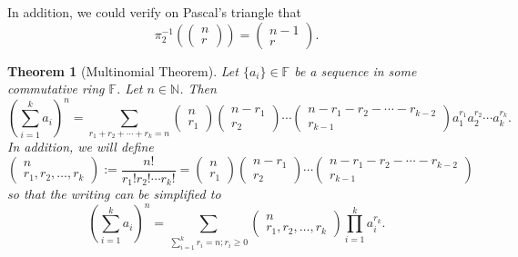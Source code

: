 \documentclass[12pt]{article}
\newtheorem*{theorem}{Theorem}
\begin{document}
    In addition, we could verify on Pascal's triangle that \[\pi_2^{-1}(\begin{pmatrix}
        n\\r
    \end{pmatrix})=\begin{pmatrix}
        n-1\\r
    \end{pmatrix}.\]

    \begin{theorem}[Multinomial Theorem]
        Let $\{a_i\}\in\mathbb{F}$ be a sequence in some commutative ring $\mathbb{F}$. Let $n\in\mathbb{N}$. Then \[(\sum_{i=1}^{k}a_i)^n=\sum_{r_1+r_2+\cdots+r_k=n}\begin{pmatrix}
            n\\r_1
        \end{pmatrix}\begin{pmatrix}
            n-r_1\\r_2
        \end{pmatrix}\cdots\begin{pmatrix}
            n-r_1-r_2-\cdots-r_{k-2}\\r_{k-1}
        \end{pmatrix}a_1^{r_1}a_2^{r_2}\cdots a_k^{r_k}.\]
        In addition, we will define \[\begin{pmatrix}
            n\\r_1,r_2,\dots,r_k
        \end{pmatrix}:=\frac{n!}{r_1!r_2!\cdots r_k!}=\begin{pmatrix}
            n\\r_1
        \end{pmatrix}\begin{pmatrix}
            n-r_1\\r_2
        \end{pmatrix}\cdots\begin{pmatrix}
            n-r_1-r_2-\cdots-r_{k-2}\\r_{k-1}
        \end{pmatrix}\] so that the writing can be simplified to \[(\sum_{i=1}^{k}a_i)^n=\sum_{\sum_{i=1}^{k}r_i=n; r_i\geq 0}\begin{pmatrix}
            n\\r_1,r_2,\dots,r_k
        \end{pmatrix}\prod_{i=1}^k a_i^{r_k}.\]
    \end{theorem}
\end{document}
